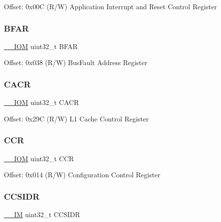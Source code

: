 Offset\+: 0x00C (R/W) Application Interrupt and Reset Control Register \mbox{\label{struct_s_c_b___type_a3fde073744418e2fe476333cb4d55d0d}} 
\subsubsection{\texorpdfstring{B\+F\+AR}{BFAR}}
{\footnotesize\ttfamily \mbox{\hyperlink{core__cm4_8h_ab6caba5853a60a17e8e04499b52bf691}{\+\_\+\+\_\+\+I\+OM}} uint32\+\_\+t B\+F\+AR}

Offset\+: 0x038 (R/W) Bus\+Fault Address Register \mbox{\label{struct_s_c_b___type_a39711bf09810b078ac81b2c76c6908f6}} 
\subsubsection{\texorpdfstring{C\+A\+CR}{CACR}}
{\footnotesize\ttfamily \mbox{\hyperlink{core__cm4_8h_ab6caba5853a60a17e8e04499b52bf691}{\+\_\+\+\_\+\+I\+OM}} uint32\+\_\+t C\+A\+CR}

Offset\+: 0x29C (R/W) L1 Cache Control Register \mbox{\label{struct_s_c_b___type_ad68b5c1f2d9845ef4247cf2d9b041336}} 
\subsubsection{\texorpdfstring{C\+CR}{CCR}}
{\footnotesize\ttfamily \mbox{\hyperlink{core__cm4_8h_ab6caba5853a60a17e8e04499b52bf691}{\+\_\+\+\_\+\+I\+OM}} uint32\+\_\+t C\+CR}

Offset\+: 0x014 (R/W) Configuration Control Register \mbox{\label{struct_s_c_b___type_a90c793639fc9470e50e4f4fc4b3464da}} 
\subsubsection{\texorpdfstring{C\+C\+S\+I\+DR}{CCSIDR}}
{\footnotesize\ttfamily \mbox{\hyperlink{core__cm4_8h_a4cc1649793116d7c2d8afce7a4ffce43}{\+\_\+\+\_\+\+IM}} uint32\+\_\+t C\+C\+S\+I\+DR}

